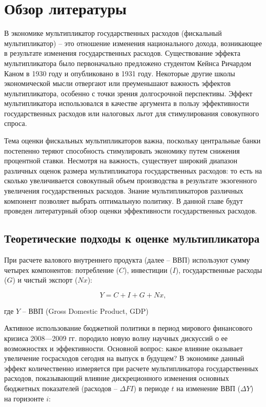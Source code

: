 \documentclass[12pt, a4paper]{extarticle}
\begin{document}
\newpage
\section{Обзор литературы}

\par
    В экономике мультипликатор государственных расходов (фискальный мультипликатор) -- это отношение изменения национального дохода, возникающее в результате изменения государственных расходов. Существование эффекта мультипликатора было первоначально предложено студентом Кейнса Ричардом Каном в 1930 году и опубликовано в 1931 году.\cite{keyns} Некоторые другие школы экономической мысли отвергают или преуменьшают важность эффектов мультипликатора, особенно с точки зрения долгосрочной перспективы. Эффект мультипликатора использовался в качестве аргумента в пользу эффективности государственных расходов или налоговых льгот для стимулирования совокупного спроса.

\par
    Тема оценки фискальных мультипликаторов важна, поскольку центральные банки постепенно теряют способность стимулировать экономику путем снижения процентной ставки. Несмотря на важность, существует широкий диапазон различных оценок размера мультипликатора государственных расходов: то есть на сколько увеличивается совокупный объем производства в результате экзогенного увеличения государственных расходов. Знание мультипликаторов различных компонент позволяет выбрать оптимальную политику. В данной главе будут проведен литературный обзор оценки эффективности государственных расходов.
    
\subsection{Теоретические подходы к оценке мультипликатора}

\par
    При расчете валового внутреннего продукта (далее -- ВВП) используют сумму четырех компонентов: потребление ($C$), инвестиции ($I$), государственные расходы ($G$) и чистый экспорт ($Nx$):


\begin{equation}
    Y = C + I + G + Nx, 
    \label{eq: GDP}
\end{equation}

где $Y$ -- ВВП (Gross Domestic Product, GDP)


\par
    Активное использование бюджетной политики в период мирового финансового кризиса 2008—2009 гг. породило новую волну научных дискуссий о ее возможностях и эффективности. Основной вопрос: какое влияние оказывает увеличение госрасходов сегодня на выпуск в будущем? В экономике данный эффект количественно измеряется при расчете мультипликатора государственных расходов, показывающий влияние дискреционного изменения основных бюджетных показателей (расходов – $\Delta FI$) в периоде $t$ на изменение ВВП ($\Delta Y$) на горизонте $i$:
\end{document}
